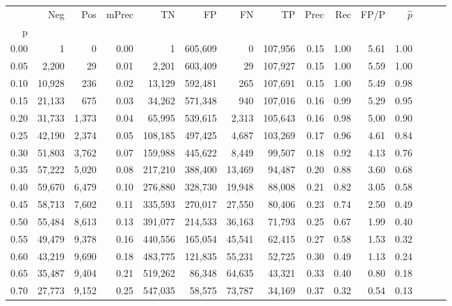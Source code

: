 \begin{tabular}{rrrrrrrrrrrrrrr}
\toprule
{} &     Neg &    Pos & mPrec &       TN &       FP &       FN &       TP &  Prec &   Rec &  FP/P & $\hat{p}$ \\
p    &         &        &       &          &          &          &          &       &       &       &           \\
\midrule
0.00 &       1 &      0 &  0.00 &        1 &  605,609 &        0 &  107,956 &  0.15 &  1.00 &  5.61 &      1.00 \\
0.05 &   2,200 &     29 &  0.01 &    2,201 &  603,409 &       29 &  107,927 &  0.15 &  1.00 &  5.59 &      1.00 \\
0.10 &  10,928 &    236 &  0.02 &   13,129 &  592,481 &      265 &  107,691 &  0.15 &  1.00 &  5.49 &      0.98 \\
0.15 &  21,133 &    675 &  0.03 &   34,262 &  571,348 &      940 &  107,016 &  0.16 &  0.99 &  5.29 &      0.95 \\
0.20 &  31,733 &  1,373 &  0.04 &   65,995 &  539,615 &    2,313 &  105,643 &  0.16 &  0.98 &  5.00 &      0.90 \\
0.25 &  42,190 &  2,374 &  0.05 &  108,185 &  497,425 &    4,687 &  103,269 &  0.17 &  0.96 &  4.61 &      0.84 \\
0.30 &  51,803 &  3,762 &  0.07 &  159,988 &  445,622 &    8,449 &   99,507 &  0.18 &  0.92 &  4.13 &      0.76 \\
0.35 &  57,222 &  5,020 &  0.08 &  217,210 &  388,400 &   13,469 &   94,487 &  0.20 &  0.88 &  3.60 &      0.68 \\
0.40 &  59,670 &  6,479 &  0.10 &  276,880 &  328,730 &   19,948 &   88,008 &  0.21 &  0.82 &  3.05 &      0.58 \\
0.45 &  58,713 &  7,602 &  0.11 &  335,593 &  270,017 &   27,550 &   80,406 &  0.23 &  0.74 &  2.50 &      0.49 \\
0.50 &  55,484 &  8,613 &  0.13 &  391,077 &  214,533 &   36,163 &   71,793 &  0.25 &  0.67 &  1.99 &      0.40 \\
0.55 &  49,479 &  9,378 &  0.16 &  440,556 &  165,054 &   45,541 &   62,415 &  0.27 &  0.58 &  1.53 &      0.32 \\
0.60 &  43,219 &  9,690 &  0.18 &  483,775 &  121,835 &   55,231 &   52,725 &  0.30 &  0.49 &  1.13 &      0.24 \\
0.65 &  35,487 &  9,404 &  0.21 &  519,262 &   86,348 &   64,635 &   43,321 &  0.33 &  0.40 &  0.80 &      0.18 \\
0.70 &  27,773 &  9,152 &  0.25 &  547,035 &   58,575 &   73,787 &   34,169 &  0.37 &  0.32 &  0.54 &      0.13 \\

\end{tabular}
